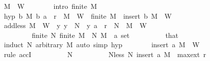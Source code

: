 \begin{isabellebody}
\ {\isachardoublequoteopen}M\ {\isasymin}\ {\isacharquery}{\kern0pt}W{\isachardoublequoteclose}\isanewline
\ \ \ \ \ \ \isamarkupfalse%
\ {\isacharbrackleft}{\kern0pt}intro{\isacharbrackright}{\kern0pt}{\isacharcolon}{\kern0pt}\ {\isachardoublequoteopen}finite\ M{\isachardoublequoteclose}\isanewline
\ \ \ \ \ \ \isamarkupfalse%
\ hyp{\isacharcolon}{\kern0pt}\ {\isachardoublequoteopen}{\isasymAnd}b\ M{\isachardot}{\kern0pt}\ {\isacharparenleft}{\kern0pt}b{\isacharcomma}{\kern0pt}\ a{\isacharparenright}{\kern0pt}\ {\isasymin}\ r\ {\isasymLongrightarrow}\ M\ {\isasymin}\ {\isacharquery}{\kern0pt}W\ {\isasymLongrightarrow}\ finite\ M\ {\isasymLongrightarrow}\ insert\ b\ M\ {\isasymin}\ {\isacharquery}{\kern0pt}W{\isachardoublequoteclose}\isanewline
\ \ \ \ \ \ \isamarkupfalse%
\ add{\isacharunderscore}{\kern0pt}less{\isacharcolon}{\kern0pt}\ {\isachardoublequoteopen}M\ {\isasymin}\ {\isacharquery}{\kern0pt}W\ {\isasymLongrightarrow}\ {\isacharparenleft}{\kern0pt}{\isasymAnd}y{\isachardot}{\kern0pt}\ y\ {\isasymin}\ N\ {\isasymLongrightarrow}\ {\isacharparenleft}{\kern0pt}y{\isacharcomma}{\kern0pt}\ a{\isacharparenright}{\kern0pt}\ {\isasymin}\ r{\isacharparenright}{\kern0pt}\ {\isasymLongrightarrow}\ N\ {\isasymunion}\ M\ {\isasymin}\ {\isacharquery}{\kern0pt}W{\isachardoublequoteclose}\isanewline
\ \ \ \ \ \ \ \ \ {\isachardoublequoteopen}finite\ N{\isachardoublequoteclose}\ {\isachardoublequoteopen}finite\ M{\isachardoublequoteclose}\ \ N\ M\ {\isacharcolon}{\kern0pt}{\isacharcolon}{\kern0pt}\ {\isachardoublequoteopen}{\isacharprime}{\kern0pt}a\ set{\isachardoublequoteclose}\isanewline
\ \ \ \ \ \ \ \ \isamarkupfalse%
\ that\ \isamarkupfalse%
\ {\isacharparenleft}{\kern0pt}induct\ N\ arbitrary{\isacharcolon}{\kern0pt}\ M{\isacharparenright}{\kern0pt}\ {\isacharparenleft}{\kern0pt}auto\ simp{\isacharcolon}{\kern0pt}\ hyp{\isacharparenright}{\kern0pt}\isanewline
\ \ \ \ \ \ \isamarkupfalse%
\ {\isachardoublequoteopen}insert\ a\ M\ {\isasymin}\ {\isacharquery}{\kern0pt}W{\isachardoublequoteclose}\isanewline
\ \ \ \ \ \ \isamarkupfalse%
\ {\isacharparenleft}{\kern0pt}rule\ accI{\isacharparenright}{\kern0pt}\isanewline
\ \ \ \ \ \ \ \ \isamarkupfalse%
\ N\isanewline
\ \ \ \ \ \ \ \ \isamarkupfalse%
\ Nless{\isacharcolon}{\kern0pt}\ {\isachardoublequoteopen}{\isacharparenleft}{\kern0pt}N{\isacharcomma}{\kern0pt}\ insert\ a\ M{\isacharparenright}{\kern0pt}\ {\isasymin}\ max{\isacharunderscore}{\kern0pt}ext\ r{\isachardoublequoteclose}\isanewline

\end{isabellebody}
